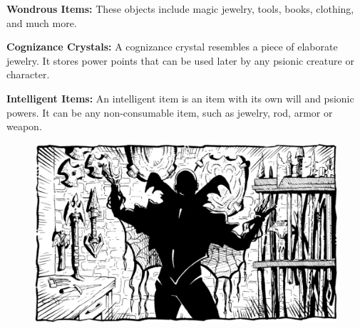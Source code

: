 \textbf{Wondrous Items:} These objects include magic jewelry, tools, books, clothing, and much more.

\textbf{Cognizance Crystals:} A cognizance crystal resembles a piece of elaborate jewelry. It stores power points that can be used later by any psionic creature or character.

\textbf{Intelligent Items:} An intelligent item is an item with its own will and psionic powers. It can be any non-consumable item, such as jewelry, rod, armor or weapon.

\begin{figure}[t!]
\centering
\includegraphics[width=\textwidth-1cm]{images/weapons-1.png}
\WOTC
\end{figure}









